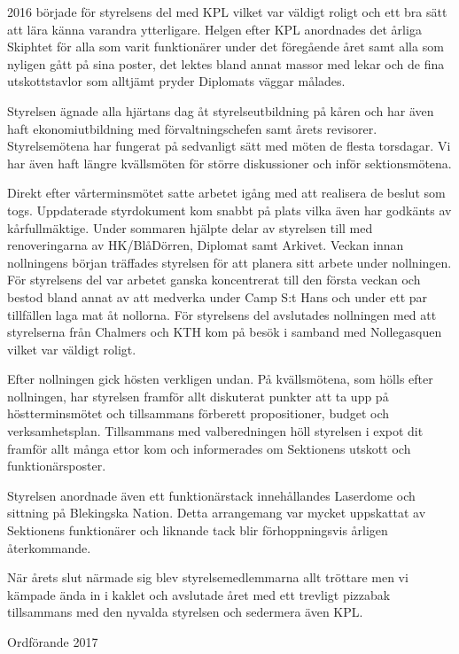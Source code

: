 \documentclass[../_main/handlingar.tex]{subfiles}
\begin{document}
2016 började för styrelsens del med KPL vilket var väldigt roligt och ett bra sätt att lära känna varandra ytterligare. Helgen efter KPL anordnades det årliga Skiphtet för alla som varit funktionärer under det föregående året samt alla som nyligen gått på sina poster, det lektes bland annat massor med lekar och de fina utskottstavlor som alltjämt pryder Diplomats väggar målades.

Styrelsen ägnade alla hjärtans dag åt styrelseutbildning på kåren och har även haft ekonomiutbildning med förvaltningschefen samt årets revisorer. Styrelsemötena har fungerat på sedvanligt sätt med möten de flesta torsdagar. Vi har även haft längre kvällsmöten för större diskussioner och inför sektionsmötena.

Direkt efter vårterminsmötet satte arbetet igång med att realisera de beslut som togs. Uppdaterade styrdokument kom snabbt på plats vilka även har godkänts av kårfullmäktige. Under sommaren hjälpte delar av styrelsen till med renoveringarna av HK/BlåDörren, Diplomat samt Arkivet. Veckan innan nollningens början träffades styrelsen för att planera sitt arbete under nollningen. För styrelsens del var arbetet ganska koncentrerat till den första veckan och bestod bland annat av att medverka under Camp S:t Hans och under ett par tillfällen laga mat åt nollorna. För styrelsens del avslutades nollningen med att styrelserna från Chalmers och KTH kom på besök i samband med Nollegasquen vilket var väldigt roligt.

Efter nollningen gick hösten verkligen undan. På kvällsmötena, som hölls efter nollningen, har styrelsen framför allt diskuterat punkter att ta upp på höstterminsmötet och tillsammans förberett propositioner, budget och verksamhetsplan. Tillsammans med valberedningen höll styrelsen i expot dit framför allt många ettor kom och informerades om Sektionens utskott och funktionärsposter.

Styrelsen anordnade även ett funktionärstack innehållandes Laserdome och sittning på Blekingska Nation. Detta arrangemang var mycket uppskattat av Sektionens funktionärer och liknande tack blir förhoppningsvis årligen återkommande.

När årets slut närmade sig blev styrelsemedlemmarna allt tröttare men vi kämpade ända in i kaklet och avslutade året med ett trevligt pizzabak tillsammans med den nyvalda styrelsen och sedermera även KPL.
\begin{signatures}{1}
    \mvh
    \signature{Erik Månsson}{Ordförande 2017}
\end{signatures}
\end{document}
